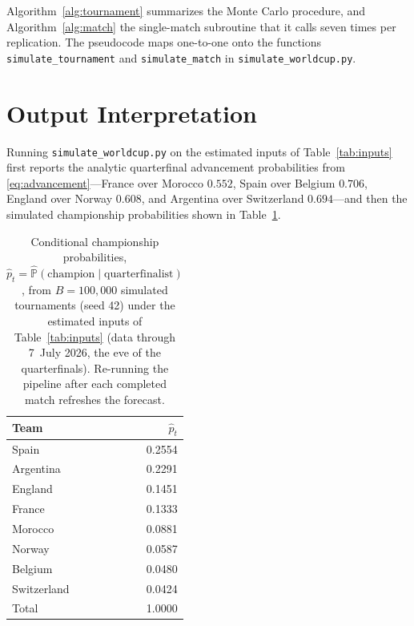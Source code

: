\documentclass[11pt]{article}
\newcommand{\Prob}{\mathbb{P}}
\begin{document}
Algorithm~\ref{alg:tournament} summarizes the Monte Carlo procedure, and
Algorithm~\ref{alg:match} the single-match subroutine that it calls seven
times per replication. The pseudocode maps one-to-one onto the functions
\texttt{simulate\_tournament} and \texttt{simulate\_match} in
\texttt{simulate\_worldcup.py}.



\section{Output Interpretation}
\label{sec:output}

Running \texttt{simulate\_worldcup.py} on the estimated inputs of
Table~\ref{tab:inputs} first reports the analytic quarterfinal advancement
probabilities from \eqref{eq:advancement}---France over Morocco $0.552$,
Spain over Belgium $0.706$, England over Norway $0.608$, and Argentina over
Switzerland $0.694$---and then the simulated championship probabilities shown
in Table~\ref{tab:output}.

\begin{table}[htbp]
\centering
\caption{Conditional championship probabilities,
$\hat{p}_t = \widehat{\Prob}(\text{champion} \mid \text{quarterfinalist})$,
from $B = 100{,}000$ simulated tournaments (seed 42) under the estimated
inputs of Table~\ref{tab:inputs} (data through 7~July 2026, the eve of the
quarterfinals). Re-running the pipeline after each completed match refreshes
the forecast.}
\label{tab:output}
\begin{tabular}{lr}
\toprule
Team & $\hat{p}_t$\\
\midrule
Spain       & 0.2554\\
Argentina   & 0.2291\\
England     & 0.1451\\
France      & 0.1333\\
Morocco     & 0.0881\\
Norway      & 0.0587\\
Belgium     & 0.0480\\
Switzerland & 0.0424\\
\midrule
Total       & 1.0000\\
\bottomrule
\end{tabular}
\end{table}
\end{document}
